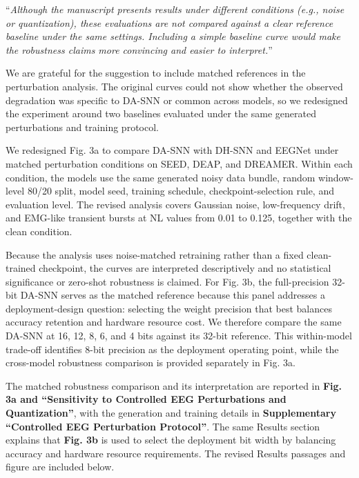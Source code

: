 \documentclass[12pt,technote,onecolumn]{IEEEtran}
\begin{document}
\vspace{4mm}

``{\it Although the manuscript presents results under different conditions
(e.g., noise or quantization), these evaluations are not compared
against a clear reference baseline under the same settings. Including a
simple baseline curve would make the robustness claims more convincing
and easier to interpret.}''
\vspace{1mm}


We are grateful for the suggestion to include matched references in the perturbation analysis. The original curves could not show whether the observed degradation was specific to DA-SNN or common across models, so we redesigned the experiment around two baselines evaluated under the same generated perturbations and training protocol.

We redesigned Fig. 3a to compare DA-SNN with DH-SNN and EEGNet under
matched perturbation conditions on SEED, DEAP, and DREAMER. Within each
condition, the models use the same generated noisy data bundle, random
window-level 80/20 split, model seed, training schedule,
checkpoint-selection rule, and evaluation level. The revised analysis
covers Gaussian noise, low-frequency drift, and EMG-like transient
bursts at NL values from 0.01 to 0.125, together with the clean
condition.

Because the analysis uses noise-matched retraining rather than a
fixed clean-trained checkpoint, the curves are interpreted descriptively
and no statistical significance or zero-shot robustness is claimed. For
Fig. 3b, the full-precision 32-bit DA-SNN serves as the matched reference
because this panel addresses a deployment-design question: selecting the
weight precision that best balances accuracy retention and hardware
resource cost. We therefore compare the same DA-SNN at 16, 12, 8, 6,
and 4 bits against its 32-bit reference. This within-model trade-off
identifies 8-bit precision as the deployment operating point, while the
cross-model robustness comparison is provided separately in Fig. 3a.



The matched robustness comparison and its interpretation are reported in \textbf{Fig. 3a and ``Sensitivity to Controlled EEG Perturbations and Quantization''}, with the generation and training details in \textbf{Supplementary ``Controlled EEG Perturbation Protocol''}. The same Results section explains that \textbf{Fig. 3b} is used to select the deployment bit width by balancing accuracy and hardware resource requirements. The revised Results passages and figure are included below.
\end{document}
